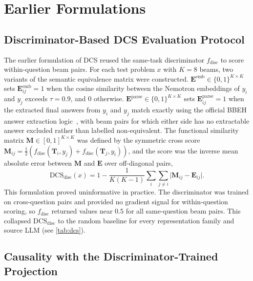 \section{Earlier Formulations}
\label{appendix:earlier}

\subsection{Discriminator-Based DCS Evaluation Protocol}
\label{appendix:sub:dcs_disc}

The earlier formulation of DCS reused the same-task discriminator $f_{\mathrm{disc}}$ to score within-question beam pairs.
For each test problem $x$ with $K=8$ beams, two variants of the semantic equivalence matrix were constructed.
$\mathbf{E}^{\mathrm{emb}} \in \{0,1\}^{K \times K}$ sets $\mathbf{E}^{\mathrm{emb}}_{ij} = 1$ when the cosine similarity between the Nemotron embeddings of $y_i$ and $y_j$ exceeds $\tau = 0.9$, and $0$ otherwise.
$\mathbf{E}^{\mathrm{parse}} \in \{0,1\}^{K \times K}$ sets $\mathbf{E}^{\mathrm{parse}}_{ij} = 1$ when the extracted final answers from $y_i$ and $y_j$ match exactly using the official BBEH answer extraction logic~\citep{kazemi2025bigbenchextrahard}, with beam pairs for which either side has no extractable answer excluded rather than labelled non-equivalent.
The functional similarity matrix $\mathbf{M} \in [0,1]^{K \times K}$ was defined by the symmetric cross score $\mathbf{M}_{ij} = \tfrac{1}{2}(f_{\mathrm{disc}}(\mathbf{T}_i, y_j) + f_{\mathrm{disc}}(\mathbf{T}_j, y_i))$, and the score was the inverse mean absolute error between $\mathbf{M}$ and $\mathbf{E}$ over off-diagonal pairs,
\begin{equation}\label{eq:dcs-disc-earlier}
    \mathrm{DCS}_{\mathrm{disc}}(x) = 1 - \frac{1}{K(K-1)}\sum_{i}\sum_{j \neq i} \bigl|\mathbf{M}_{ij} - \mathbf{E}_{ij}\bigr|.
\end{equation}
This formulation proved uninformative in practice.
The discriminator was trained on cross-question pairs and provided no gradient signal for within-question scoring, so $f_{\mathrm{disc}}$ returned values near $0.5$ for all same-question beam pairs.
This collapsed $\mathrm{DCS}_{\mathrm{disc}}$ to the random baseline for every representation family and source LLM (see \cref{tab:dcs}).

\subsection{Causality with the Discriminator-Trained Projection}
\label{appendix:sub:causality_disc_proj}

